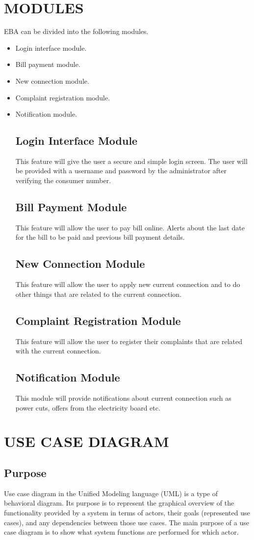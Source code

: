 \documentclass[12pt,a4paper,oneside]{report}
\begin{document}
\section{MODULES}
EBA can be divided  into the following modules.
\begin{itemize}
\item{Login interface module.}
\item{Bill payment module. }
\item{New connection module.}
\item{Complaint registration module.}
\item{Notification module.}
\subsection{Login Interface Module}
\par This feature will give the user a secure and simple login screen. The user will be provided
with a username and password by the administrator after verifying the consumer number.
\subsection{Bill Payment Module}
This feature will allow the user to pay bill online. Alerts about the last date for the bill to
be paid and previous bill payment details.
\subsection{New Connection Module}
This feature will allow the user to apply new current connection and to do other things
that are related to the current connection.
\subsection{Complaint Registration Module}
This feature will allow the user to register their complaints that are related with the current
connection.
\subsection{Notification Module}
This module will provide notifications about current connection such as power cuts, offers
from the electricity board etc.
\end{itemize}
\newpage
\section{USE CASE DIAGRAM}
\subsection{Purpose}
Use case diagram in the Unified Modeling language (UML) is a type of behavioral
diagram. Its purpose is to represent the graphical overview of the functionality provided by a
system in terms of actors, their goals (represented use cases), and any dependencies between
those use cases. The main purpose of a use case diagram is to show what system functions are
performed for which actor.\\
\end{document}

